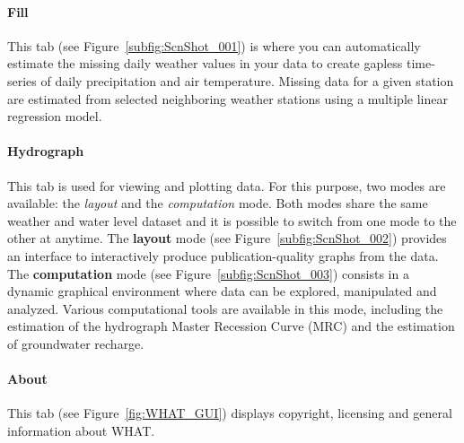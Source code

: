 \documentclass[12pt, letterpaper, fleqn]{report}
\begin{document}
\paragraph{Fill} This tab (see Figure~\ref{subfig:ScnShot_001}) is where you can automatically estimate the missing daily weather values in your data to create gapless time-series of daily precipitation and air temperature. Missing data for a given station are estimated from selected neighboring weather stations using a multiple linear regression model.

\paragraph{Hydrograph} This tab is used for viewing and plotting data. For this purpose, two modes are available: the \emph{layout} and the \emph{computation} mode. Both modes share the same weather and water level dataset and it is possible to switch from one mode to the other at anytime. The \textbf{layout} mode (see Figure~\ref{subfig:ScnShot_002}) provides an interface to interactively produce publication-quality graphs from the data. The \textbf{computation} mode (see Figure~\ref{subfig:ScnShot_003}) consists in a dynamic graphical environment where data can be explored, manipulated and analyzed. Various computational tools are available in this mode, including the estimation of the hydrograph Master Recession Curve (MRC) and the estimation of groundwater recharge.

\paragraph{About} This tab (see Figure~\ref{fig:WHAT_GUI}) displays copyright, licensing and general information about WHAT.
\end{document}
